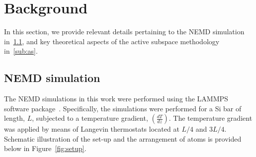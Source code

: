 \section{Background}
\label{sec:bg}

In this section, we provide relevant details pertaining to the NEMD simulation in~\ref{sub:nemd}, and
key theoretical aspects of the active subspace methodology in~\ref{sub:as}.

\subsection{NEMD simulation}
\label{sub:nemd}

The NEMD simulations in this work were performed using the LAMMPS software package~\cite{Plimpton:2007}.
Specifically, the simulations were performed for a Si bar of length, $L$, subjected to a temperature gradient, 
$\left(\frac{dT}{dz}\right)$. The temperature gradient was applied by means of Langevin thermostats located
at $L/4$ and $3L/4$. Schematic illustration of the set-up and the arrangement of atoms is provided below in 
Figure~\ref{fig:setup}.

